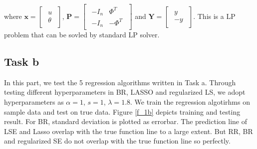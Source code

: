 \documentclass[a4paper]{article}
\begin{document}
where $\bm{x} =\begin{bmatrix} \begin{smallmatrix} u \\ \theta \end{smallmatrix} \end{bmatrix}$, $\bm{P}=\begin{bmatrix} \begin{smallmatrix} -I_n & \Phi^T \\ -I_n & -\Phi^T \end{smallmatrix} \end{bmatrix}$ and  $\bm{Y} =\begin{bmatrix} \begin{smallmatrix} y \\ -y \end{smallmatrix} \end{bmatrix}$. This is a LP problem that can be sovled by standard LP solver. 


\subsection{Task b}
In this part, we test the 5 regression algorithms written in Task a. Through testing different hyperparameters in BR, LASSO and regularized LS, we adopt hyperparameters as $\alpha = 1$, $s=1$, $\lambda = 1.8$. We train the regression algotirhms on sample data and test on true data. Figure \ref{f_1b} depicts training and testing result. For BR, standard deviation is plotted as errorbar. The prediction line of LSE and Lasso overlap with the true function line to a large extent. But RR, BR and regularized SE do not overlap with the true function line so perfectly.\\
\end{document}
